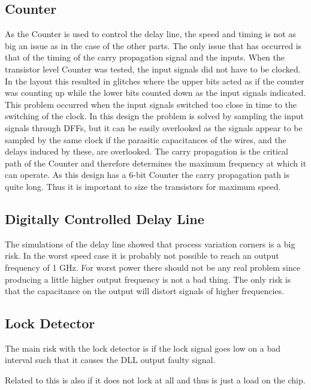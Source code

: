 \documentclass[a4paper,12pt]{article} \usepackage{graphicx}
\begin{document}
\subsection{Counter}
As the Counter is used to control the delay line, the speed and timing is not as
big an issue as in the case of the other parts. The only issue that has occurred
is that of the timing of the carry propagation signal and the inputs. When the
transistor level Counter was tested, the input signals did not have to be
clocked. In the layout this resulted in glitches where the upper bits acted as
if the counter was counting up while the lower bits counted down as the input
signals indicated. This problem occurred when the input signals switched too
close in time to the switching of the clock. In this design the problem is
solved by sampling the input signals through DFFs, but it can be easily
overlooked as the signals appear to be sampled by the same clock if the
parasitic capacitances of the wires, and the delays induced by these, are
overlooked. The carry propagation is the critical path of the Counter and
therefore determines the maximum frequency at which it can operate. As this
design has a 6-bit Counter the carry propagation path is quite long. Thus it is
important to size the transistors for maximum speed. 

\subsection{Digitally Controlled Delay Line}
The simulations of the delay line showed that process variation corners is a big
risk. In the worst speed case it is probably not possible to reach an output
frequency of 1 GHz. For worst power there should not be any real problem since
producing a little higher output frequency is not a bad thing. The only risk is
that the capacitance on the output will distort signals of higher frequencies.

\subsection{Lock Detector}
The main risk with the lock detector is if the lock signal goes low on a bad
interval such that it causes the DLL output faulty signal.


Related to this is also if it does not lock at all and thus is just a load on the chip. 
\end{document}
